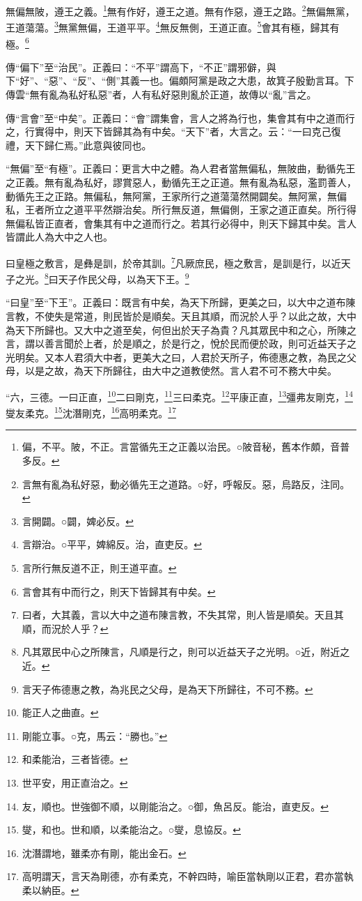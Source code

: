 無偏無陂，遵王之義。\footnote{偏，不平。陂，不正。言當循先王之正義以治民。○陂音秘，舊本作頗，音普多反。}無有作好，遵王之道。無有作惡，遵王之路。\footnote{言無有亂為私好惡，動必循先王之道路。○好，呼報反。惡，烏路反，注同。}無偏無黨，王道蕩蕩。\footnote{言開闢。○闢，婢必反。}無黨無偏，王道平平。\footnote{言辯治。○平平，婢綿反。治，直吏反。}無反無側，王道正直。\footnote{言所行無反道不正，則王道平直。}會其有極，歸其有極。\footnote{言會其有中而行之，則天下皆歸其有中矣。}


{\noindent\zhuan{}\fzbyks 傳“偏下”至“治民”。正義曰：“不平”謂高下，“不正”謂邪僻，與下“好”、“惡”、“反”、“側”其義一也。偏頗阿黨是政之大患，故箕子殷勤言耳。下傳雲“無有亂為私好私惡”者，人有私好惡則亂於正道，故傳以“亂”言之。 \par}

{\noindent\zhuan{}\fzbyks 傳“言會”至“中矣”。正義曰：“會”謂集會，言人之將為行也，集會其有中之道而行之，行實得中，則天下皆歸其為有中矣。“天下”者，大言之。云：“一曰克己復禮，天下歸仁焉。”此意與彼同也。 \par}

{\noindent\shu{}\fzkt “無偏”至“有極”。正義曰：更言大中之體。為人君者當無偏私，無陂曲，動循先王之正義。無有亂為私好，謬賞惡人，動循先王之正道。無有亂為私惡，濫罰善人，動循先王之正路。無偏私，無阿黨，王家所行之道蕩蕩然開闢矣。無阿黨，無偏私，王者所立之道平平然辯治矣。所行無反道，無偏側，王家之道正直矣。所行得無偏私皆正直者，會集其有中之道而行之。若其行必得中，則天下歸其中矣。言人皆謂此人為大中之人也。 \par}

曰皇極之敷言，是彝是訓，於帝其訓。\footnote{曰者，大其義，言以大中之道布陳言教，不失其常，則人皆是順矣。天且其順，而況於人乎？}凡厥庶民，極之敷言，是訓是行，以近天子之光。\footnote{凡其眾民中心之所陳言，凡順是行之，則可以近益天子之光明。○近，附近之近。}曰天子作民父母，以為天下王。\footnote{言天子佈德惠之教，為兆民之父母，是為天下所歸往，不可不務。}

{\noindent\shu{}\fzkt “曰皇”至“下王”。正義曰：既言有中矣，為天下所歸，更美之曰，以大中之道布陳言教，不使失是常道，則民皆於是順矣。天且其順，而況於人乎？以此之故，大中為天下所歸也。又大中之道至矣，何但出於天子為貴？凡其眾民中和之心，所陳之言，謂以善言聞於上者，於是順之，於是行之，悅於民而便於政，則可近益天子之光明矣。又本人君須大中者，更美大之曰，人君於天所子，佈德惠之教，為民之父母，以是之故，為天下所歸往，由大中之道教使然。言人君不可不務大中矣。 \par}

“六，三德。一曰正直，\footnote{能正人之曲直。}二曰剛克，\footnote{剛能立事。○克，馬云：“勝也。”}三曰柔克。\footnote{和柔能治，三者皆德。}平康正直，\footnote{世平安，用正直治之。}彊弗友剛克，\footnote{友，順也。世強御不順，以剛能治之。○御，魚呂反。能治，直吏反。}燮友柔克。\footnote{燮，和也。世和順，以柔能治之。○燮，息協反。}沈潛剛克，\footnote{沈潛謂地，雖柔亦有剛，能出金石。}高明柔克。\footnote{高明謂天，言天為剛德，亦有柔克，不幹四時，喻臣當執剛以正君，君亦當執柔以納臣。}


